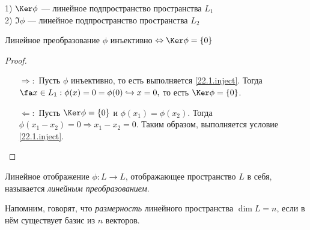   \begin{stt} $ $ \\
  1) $\Ker\phi$ --- линейное подпространство пространства $L_1$ \\
  2) $\Im\phi$ --- линейное подпространство пространства $L_2$
  \end{stt}
  \begin{thm}
  Линейное преобразование $\phi$ инъективно $\Leftrightarrow \Ker\phi=\{0\}$
  \end{thm}
  \begin{proof} $ $
  \linebreak\vspace*{-\baselineskip}
  \begin{itemize}
  \item[\underline{$\Longrightarrow:$}]   Пусть $\phi$ инъективно, то есть выполняется \eqref{22.1.inject}. Тогда \\ $\fa x\in L_1:\phi(x)=0=\phi(0) \hookrightarrow x=0,$ то есть $\Ker\phi=\{0\}$.
  \item[\underline{$\Longleftarrow:$}] 
Пусть $\Ker\phi=\{0\}$ и $\phi(x_1)=\phi(x_2)$. Тогда $\phi(x_1-x_2)=0 \Rightarrow x_1-x_2=0$. Таким образом, выполняется условие \eqref{22.1.inject}.
  \end{itemize}
  \vspace{-1.65\baselineskip}
  \end{proof}
  
  \begin{defn}
  Линейное отображение $\phi: L\rightarrow L$, отображающее пространство $L$ в себя, называется \textit{линейным преобразованием}.
  \end{defn}
  
  Напомним, говорят, что \textit{размерность} линейного пространства $\dim L = n$, если в нём существует базис из $n$ векторов.
  

